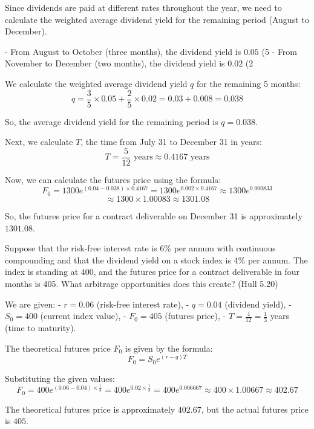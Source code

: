 \documentclass[12pt,letterpaper, onecolumn]{exam}
\begin{document}
\begin{questions}
\begin{solution}
Since dividends are paid at different rates throughout the year, we need to calculate the weighted average dividend yield for the remaining period (August to December).

- From August to October (three months), the dividend yield is \( 0.05 \) (5%
- From November to December (two months), the dividend yield is \( 0.02 \) (2%

We calculate the weighted average dividend yield \( q \) for the remaining 5 months:
\[
q = \frac{3}{5} \times 0.05 + \frac{2}{5} \times 0.02 = 0.03 + 0.008 = 0.038
\]

So, the average dividend yield for the remaining period is \( q = 0.038 \).

Next, we calculate \( T \), the time from July 31 to December 31 in years:
\[
T = \frac{5}{12} \text{ years} \approx 0.4167 \text{ years}
\]

Now, we can calculate the futures price using the formula:
\[
F_0 = 1300 e^{(0.04 - 0.038) \times 0.4167} = 1300 e^{0.002 \times 0.4167} \approx 1300 e^{0.000833} \] \[ \approx 1300 \times 1.00083 \approx 1301.08
\]

So, the futures price for a contract deliverable on December 31 is approximately \( 1301.08 \).

\end{solution}


    \newpage
    \question Suppose that the risk-free interest rate is 6\% per annum with continuous compounding
and that the dividend yield on a stock index is 4\% per annum. The index is standing at
400, and the futures price for a contract deliverable in four months is 405. What arbitrage
opportunities does this create? (Hull 5.20)

    \begin{solution}

We are given:
- \( r = 0.06 \) (risk-free interest rate),
- \( q = 0.04 \) (dividend yield),
- \( S_0 = 400 \) (current index value),
- \( F_0 = 405 \) (futures price),
- \( T = \frac{4}{12} = \frac{1}{3} \) years (time to maturity).

The theoretical futures price \( F_0 \) is given by the formula:
\[
F_0 = S_0 e^{(r - q)T}
\]

Substituting the given values:
\[
F_0 = 400 e^{(0.06 - 0.04) \times \frac{1}{3}} = 400 e^{0.02 \times \frac{1}{3}} = 400 e^{0.006667} \approx 400 \times 1.00667 \approx 402.67
\]

The theoretical futures price is approximately \( 402.67 \), but the actual futures price is \( 405 \).


\end{solution}
\end{questions}
\end{document}
